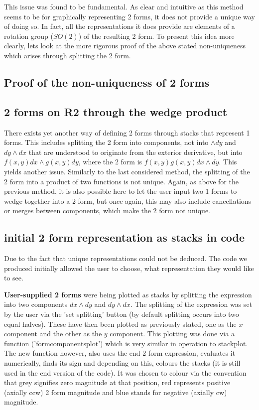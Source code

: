 \documentclass[11]{report}
\begin{document}
This issue was found to be fundamental. As clear and intuitive as this method seems to be for graphically representing 2 forms, it does not provide a unique way of doing so. In fact, all the representations it does provide are elements of a rotation group ($SO(2)$) of the resulting 2 form. To present this idea more clearly, lets look at the more rigorous proof of the above stated non-uniqueness which arises through splitting the 2 form.

\subsection{Proof of the non-uniqueness of 2 forms}





\subsection{2 forms on R2 through the wedge product}
There exists yet another way of defining 2 forms through stacks that represent 1 forms. This includes splitting the 2 form into components, not into $\wedge dy$ and $dy\wedge dx$ that are understood to originate from the exterior derivative, but into $f(x, y)dx \wedge g(x, y)dy$, where the 2 form is $f(x,y)g(x,y) dx\wedge dy$. This yields another issue. Similarly to the last considered method, the splitting of the 2 form into a product of two functions is not unique. Again, as above for the previous method, it is also possible here to let the user input two 1 forms to wedge together into a 2 form, but once again, this may also include cancellations or merges between components, which make the 2 form not unique.

\subsection{initial 2 form representation as stacks in code}
Due to the fact that unique representations could not be deduced. The code we produced initially allowed the user to choose, what representation they would like to see.

\textbf{User-supplied 2 forms} were being plotted as stacks by splitting the expression into two components $dx\wedge dy$ and $dy\wedge dx$. The splitting of the expression was set by the user via the 'set splitting' button (by default splitting occurs into two equal halves). These have then been plotted as previously stated, one as the $x$ component and the other as the $y$ component. This plotting was done via a function ('form\textunderscore components\textunderscore plot') which is very similar in operation to stack\textunderscore plot. The new function however, also uses the end 2 form expression, evaluates it numerically, finds its sign and depending on this, colours the stacks (it is still used in the end version of the code). It was chosen to colour via the convention that grey signifies zero magnitude at that position, red represents positive (axially ccw) 2 form magnitude and blue stands for negative (axially cw) magnitude.
\end{document}
